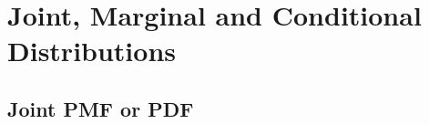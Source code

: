 \documentclass[8pt, usepdftitle=false]{beamer}
\begin{document}




  






\section{Joint, Marginal and Conditional Distributions}


\subsection{Joint PMF or PDF}
\end{document}
